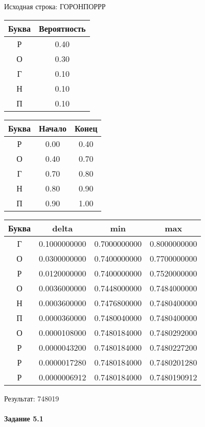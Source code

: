 \documentclass[a4paper, 12pt]{article}
\begin{document}
Исходная строка: ГОРОНПОРРР\
\begin{center}
 \begin{tabular}{ |c|c| } 
  \hline
     Буква & Вероятность \\ \hline
Р & 0.40\\\hline
О & 0.30\\\hline
Г & 0.10\\\hline
Н & 0.10\\\hline
П & 0.10
\\ \hline \end{tabular}
\end{center}
\begin{center}
 \begin{tabular}{ |c|c|c| } 
  \hline
     Буква & Начало & Конец \\ \hline
Р & 0.00 & 0.40\\\hline
О & 0.40 & 0.70\\\hline
Г & 0.70 & 0.80\\\hline
Н & 0.80 & 0.90\\\hline
П & 0.90 & 1.00
\\ \hline \end{tabular}
\end{center}
\begin{center}
 \begin{tabular}{ |c|c|c|c| } 
  \hline
     Буква & delta & min & max \\ \hline
Г & 0.1000000000 & 0.7000000000 & 0.8000000000\\\hline
О & 0.0300000000 & 0.7400000000 & 0.7700000000\\\hline
Р & 0.0120000000 & 0.7400000000 & 0.7520000000\\\hline
О & 0.0036000000 & 0.7448000000 & 0.7484000000\\\hline
Н & 0.0003600000 & 0.7476800000 & 0.7480400000\\\hline
П & 0.0000360000 & 0.7480040000 & 0.7480400000\\\hline
О & 0.0000108000 & 0.7480184000 & 0.7480292000\\\hline
Р & 0.0000043200 & 0.7480184000 & 0.7480227200\\\hline
Р & 0.0000017280 & 0.7480184000 & 0.7480201280\\\hline
Р & 0.0000006912 & 0.7480184000 & 0.7480190912
\\ \hline \end{tabular}
\end{center}
Результат: 748019
\pagebreak
\paragraph{Задание 5.1}
\end{document}
